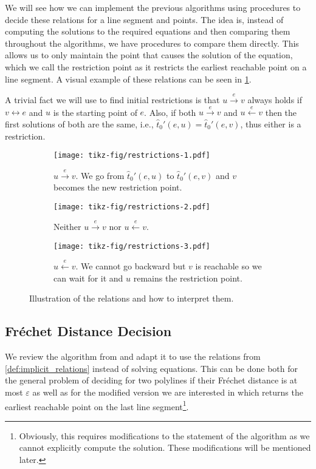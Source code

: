 We will see how we can implement the previous algorithms using procedures to decide these relations for a line segment and points. The idea is, instead of computing the solutions to the required equations and then comparing them throughout the algorithms, we have procedures to compare them directly. This allows us to only maintain the point that causes the solution of the equation, which we call the restriction point as it restricts the earliest reachable point on a line segment. A visual example of these relations can be seen in \cref{fig:restrictions}.

A trivial fact we will use to find initial restrictions is that \(u \overset e\rightarrow v\) always holds if \(v \leftrightarrow e\) and \(u\) is the starting point of \(e\). Also, if both \(u \overset e\rightarrow v\) and \(u \overset e\leftarrow v\) then the first solutions of both are the same, i.e., \(\hat t_0'(e, u) = \hat t_0'(e,v)\), thus either is a restriction. 

\begin{figure}[ht]
  \centering
  \begin{subfigure}[t]{0.3\textwidth}
    \texttt{[image: tikz-fig/restrictions-1.pdf]}
    \caption{\(u \overset e\rightarrow v\). We go from \(\hat t_0'(e, u)\) to \(\hat t_0'(e, v)\) and \(v\) becomes the new restriction point.}
  \end{subfigure}
  \begin{subfigure}[t]{0.3\textwidth}
    \texttt{[image: tikz-fig/restrictions-2.pdf]}
    \caption{Neither \(u \overset e\rightarrow v\) nor \(u \overset e\leftarrow v\).}
  \end{subfigure}
  \begin{subfigure}[t]{0.3\textwidth}
    \texttt{[image: tikz-fig/restrictions-3.pdf]}
    \caption{\(u \overset e\leftarrow v\). We cannot go backward but \(v\) is reachable so we can wait for it and \(u\) remains the restriction point. }
  \end{subfigure}
  \caption{Illustration of the relations and how to interpret them. }
  \label{fig:restrictions}
\end{figure}

\subsection{Fréchet Distance Decision}
We review the algorithm from \citeauthor{computing_the_frechet_distance_between_two_polygonal_curves} and adapt it to use the relations from \cref{def:implicit_relations} instead of solving equations. This can be done both for the general problem of deciding for two polylines if their Fréchet distance is at most \(\varepsilon\) as well as for the modified version we are interested in which returns the earliest reachable point on the last line segment\footnote{Obviously, this requires modifications to the statement of the algorithm as we cannot explicitly compute the solution. These modifications will be mentioned later.}. 

